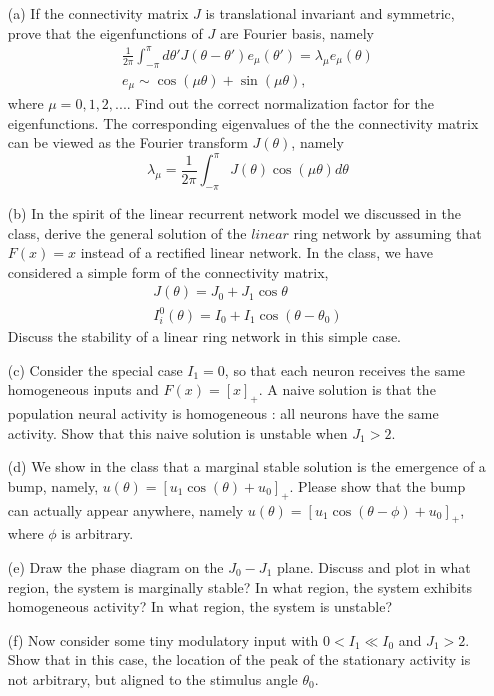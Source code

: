 \documentclass{article}
\begin{document}
\begin{enumerate}
\item[(a)] If the connectivity matrix $J$ is translational invariant and symmetric, prove that the eigenfunctions of $J$ are Fourier basis, namely 
\begin{eqnarray}
\frac{1}{2\pi}\int_{-\pi}^{\pi} d\theta' J(\theta - \theta')e_\mu(\theta') = \lambda_\mu e_\mu(\theta) \\
e_\mu \sim \cos(\mu\theta) + \sin(\mu\theta),
\end{eqnarray}
where $\mu=0,1,2,...$. Find out the correct normalization factor for the eigenfunctions. The corresponding eigenvalues of the the connectivity matrix can be viewed as the Fourier transform $J(\theta)$, namely 
\begin{equation}
\lambda_\mu = \frac{1}{2\pi}\int_{-\pi}^{\pi} J(\theta) \cos(\mu \theta)d\theta
\end{equation}
\item[(b)] In the spirit of the linear recurrent network model we discussed in the class, derive the general solution of the $linear$ ring network by assuming that  $F(x) = x$ instead of a rectified linear network. In the class, we have considered a simple form of the connectivity matrix, 
\begin{eqnarray}
J(\theta) = J_0 + J_1\cos\theta \\
I_i^0(\theta) = I_0 + I_1\cos(\theta - \theta_0)
\end{eqnarray}
Discuss the stability of a linear ring network in this simple case.
\item[(c)] Consider the special case $I_1=0$, so that each neuron receives the same homogeneous inputs and $F(x) = [x]_+$. A naive solution is that the population neural activity is homogeneous : all neurons have the same activity. Show that this naive solution is unstable when $J_1 >2$.
\item[(d)] We show in the class that a marginal stable solution is the emergence of a bump, namely, $u(\theta) = [u_1\cos (\theta) + u_0]_+$. Please show that the bump can actually appear anywhere, namely $u(\theta) = [u_1\cos (\theta - \phi) + u_0]_+$, where $\phi$ is arbitrary. 
\item[(e)] Draw the phase diagram on the $J_0-J_1$ plane. Discuss and plot in what region, the system is marginally stable?  In what region, the system exhibits homogeneous activity? In what region, the system is unstable?
\item[(f)] Now consider some tiny modulatory input with $0 < I_1 \ll I_0$ and $J_1 > 2$. Show that in this case, the location of the peak of the stationary activity is not arbitrary, but aligned to the stimulus angle $\theta_0$.

\end{enumerate}
\end{document}
